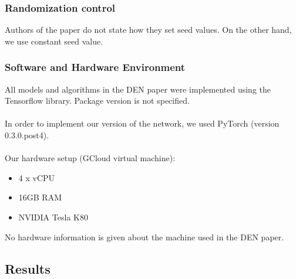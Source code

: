 \documentclass[12pt]{article}
\begin{document}
    \subsubsection{Randomization control}
    Authors of the paper do not state how they set seed values. On the other hand, we use constant
    seed value.
    
    \subsubsection{Software and Hardware Environment}
    All models and algorithms in the DEN paper were implemented using the Tensorflow library.
    Package version is not specified.
    \\
    \\
    In order to implement our version of the network, we used PyTorch (version 0.3.0.post4).
    \\
    \\
    Our hardware setup (GCloud virtual machine):
    \begin{itemize}
        \item 4 x vCPU
        \item 16GB RAM
        \item NVIDIA Tesla K80
    \end{itemize}
    \bigskip
    No hardware information is given about the machine used in the DEN paper.

    
    \subsection {Results}
      
\end{document}
